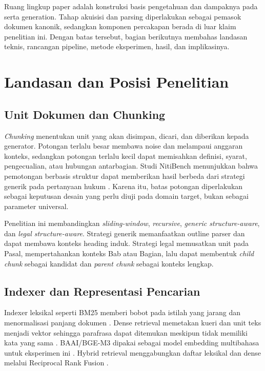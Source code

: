 Ruang lingkup paper adalah konstruksi basis pengetahuan dan dampaknya pada \retrieval serta generation. Tahap akuisisi dan parsing diperlakukan sebagai pemasok dokumen kanonik, sedangkan komponen percakapan berada di luar klaim penelitian ini. Dengan batas tersebut, bagian berikutnya membahas landasan teknis, rancangan pipeline, metode eksperimen, hasil, dan implikasinya.

\section{Landasan dan Posisi Penelitian}

\subsection{Unit Dokumen dan Chunking}

\textit{Chunking} menentukan unit yang akan disimpan, dicari, dan diberikan kepada generator. Potongan terlalu besar membawa noise dan melampaui anggaran konteks, sedangkan potongan terlalu kecil dapat memisahkan definisi, syarat, pengecualian, atau hubungan antarbagian. Studi NitiBench menunjukkan bahwa pemotongan berbasis struktur dapat memberikan hasil berbeda dari strategi generik pada pertanyaan hukum \cite{akarajaradwongNitiBenchComprehensiveStudy2025}. Karena itu, batas potongan diperlakukan sebagai keputusan desain yang perlu diuji pada domain target, bukan sebagai parameter universal.

Penelitian ini membandingkan \textit{sliding-window}, \textit{recursive}, \textit{generic structure-aware}, dan \textit{legal structure-aware}. Strategi generik memanfaatkan outline parser dan dapat membawa konteks heading induk. Strategi legal memusatkan unit pada Pasal, mempertahankan konteks Bab atau Bagian, lalu dapat membentuk \textit{child chunk} sebagai kandidat dan \textit{parent chunk} sebagai konteks lengkap.

\subsection{Indexer dan Representasi Pencarian}

Indexer leksikal seperti BM25 memberi bobot pada istilah yang jarang dan menormalisasi panjang dokumen \cite{robertsonProbabilisticRelevanceFramework2009}. Dense retrieval memetakan kueri dan unit teks menjadi vektor sehingga parafrasa dapat ditemukan meskipun tidak memiliki kata yang sama \cite{karpukhinDensePassageRetrieval2020}. BAAI/BGE-M3 dipakai sebagai model embedding multibahasa untuk eksperimen ini \cite{chenM3Embedding2024}. Hybrid retrieval menggabungkan daftar leksikal dan dense melalui Reciprocal Rank Fusion \cite{cormackReciprocalRankFusion2009}.

